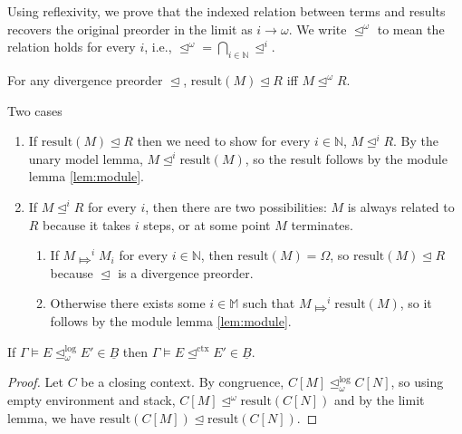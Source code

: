 \documentclass[acmsmall,nonacm]{acmart}
\renewcommand{\u}{\underline}
\newcommand{\apreorder}{\trianglelefteq}
\newcommand{\ctxize}[1]{\mathrel{{#1}^{\text{ctx}}}}
\newcommand{\ix}[2]{\mathrel{#1^{#2}}}
\newcommand{\ilrof}[2]{\mathrel{{#1}^{\text{log}}_{#2}}}
\newcommand{\bigstepsin}[1]{\mathrel{\Mapsto^{#1}}}
\newcommand{\diverge}{\Omega}
\newcommand{\result}{\text{result}}
\begin{document}
{\noindent Using reflexivity, we prove that the indexed relation between terms and
results recovers the original preorder in the limit as $i \to \omega$.
%
We write $\ix\apreorder \omega$ to mean the relation holds for every
$i$, i.e., $\ix\apreorder\omega =
\bigcap_{i\in\mathbb{N}} \ix\apreorder i$.
\begin{corollary}
  \label{lem:limit}
  For any divergence preorder $\apreorder$, \( \result(M) \apreorder
  R\) iff \( M \ix\apreorder \omega R \).
\end{corollary}
\begin{longproof}
  Two cases
  \begin{enumerate}
  \item If $\result(M) \apreorder R$ then we need to show for every $i
    \in \mathbb{N}$, $M \ix \apreorder i R$. By the unary model lemma,
    $M \ix\apreorder i \result(M)$, so the result follows by the
    module lemma \ref{lem:module}.
  \item If $M \ix\apreorder i R$ for every $i$, then there are two
    possibilities: $M$ is always related to $R$ because it takes $i$
    steps, or at some point $M$ terminates.
    \begin{enumerate}
    \item If $M \bigstepsin{i} M_i$ for every $i \in \mathbb{N}$, then
      $\result(M) = \diverge$, so $\result(M) \apreorder R$ because
      $\apreorder$ is a divergence preorder.
    \item Otherwise there exists some $i \in \mathbb{M}$ such that $M
      \bigstepsin{i} \result(M)$, so it follows by the module lemma
      \ref{lem:module}.
    \end{enumerate}
  \end{enumerate}
\end{longproof}

\begin{corollary} \label{lem:logical-implies-contextual}
  If $\Gamma \vDash E \ilrof\apreorder \omega E' \in \u B$
  then
  $\Gamma \vDash E \ctxize\apreorder E' \in \u B$.
\end{corollary}
\begin{proof}
  Let $C$ be a closing context. By congruence, $C[M] \ilrof\apreorder
  \omega C[N]$, so using empty environment and stack, $C[M]
  \ix\apreorder\omega \result(C[N])$ and by the limit lemma, we have
  $\result(C[M]) \apreorder \result(C[N])$.
\end{proof}

}
\end{document}
